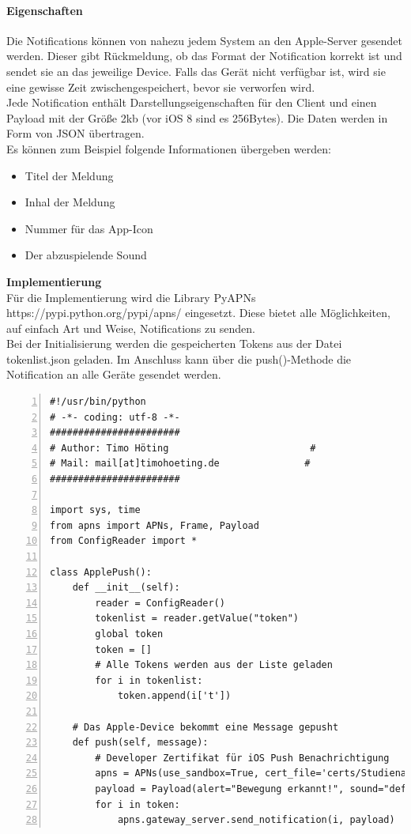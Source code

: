 \paragraph{Eigenschaften}
Die Notifications können von nahezu jedem System an den Apple-Server gesendet werden. Dieser gibt Rückmeldung, ob das Format der Notification korrekt ist und sendet sie an das jeweilige Device. Falls das Gerät nicht verfügbar ist, wird sie eine gewisse Zeit zwischengespeichert, bevor sie verworfen wird. \\
Jede Notification enthält Darstellungseigenschaften für den Client und einen Payload mit der Größe 2kb (vor iOS 8 sind es 256Bytes). Die Daten werden in Form von JSON übertragen.\\
Es können zum Beispiel folgende Informationen übergeben werden: 
\begin{itemize}
	\item Titel der Meldung
	\item Inhal der Meldung
	\item Nummer für das App-Icon
	\item Der abzuspielende Sound
\end{itemize}
\textbf{Implementierung}\\
Für die Implementierung wird die Library PyAPNs https://pypi.python.org/pypi/apns/ eingesetzt. Diese bietet alle Möglichkeiten, auf einfach Art und Weise, Notifications zu senden. \\
Bei der Initialisierung werden die gespeicherten Tokens aus der Datei tokenlist.json geladen. Im Anschluss kann über die push()-Methode die Notification an alle Geräte gesendet werden. 
\begin{lstlisting}[caption=ConfigReader / ConfigWriter, language=xml, frame=single, breaklines=true,columns=fullflexible, commentstyle=\color{gray}\upshape, captionpos=b, numbers = left]
#!/usr/bin/python
# -*- coding: utf-8 -*-
#######################
# Author: Timo Höting						  #
# Mail: mail[at]timohoeting.de				 #
#######################

import sys, time
from apns import APNs, Frame, Payload
from ConfigReader import *

class ApplePush():
	def __init__(self):
		reader = ConfigReader()
		tokenlist = reader.getValue("token")
		global token
		token = []
		# Alle Tokens werden aus der Liste geladen
		for i in tokenlist:
			token.append(i['t'])

	# Das Apple-Device bekommt eine Message gepusht
	def push(self, message):
		# Developer Zertifikat für iOS Push Benachrichtigung
		apns = APNs(use_sandbox=True, cert_file='certs/Studienarbeit-APN.crt.pem', key_file='certs/Studienarbeit-APN.key.pem')
		payload = Payload(alert="Bewegung erkannt!", sound="default", badge=1)
		for i in token:
			apns.gateway_server.send_notification(i, payload)
\end{lstlisting}


